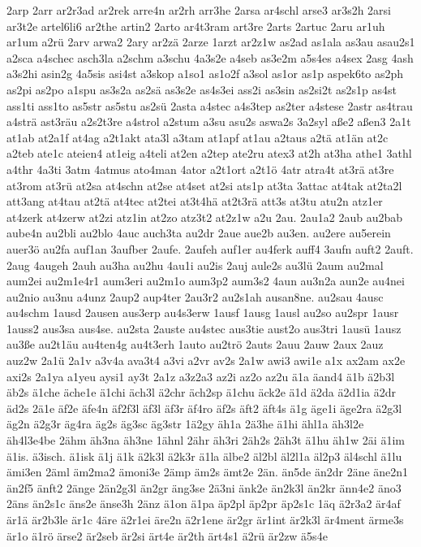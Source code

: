 {2arp
2arr
ar2r3ad
ar2rek
arre4n
ar2rh
arr3he
2arsa
ar4schl
arse3
ar3s2h
2arsi
ar3t2e
artel6li6
ar2the
artin2
2arto
ar4t3ram
art3re
2arts
2artuc
2aru
ar1uh
ar1um
a2rü
2arv
arwa2
2ary
ar2zä
2arze
1arzt
ar2z1w
as2ad
as1ala
as3au
asau2s1
a2sca
a4schec
asch3la
a2schm
a3schu
4a3s2e
a4seb
as3e2m
a5s4es
a4sex
2asg
4ash
a3s2hi
asin2g
4a5sis
asi4st
a3skop
a1so1
as1o2f
a3sol
as1or
as1p
aspek6to
as2ph
as2pi
as2po
a1spu
as3s2a
as2sä
as3s2e
as4s3ei
ass2i
as3sin
as2si2t
as2s1p
as4st
ass1ti
ass1to
as5str
as5stu
as2sü
2asta
a4stec
a4s3tep
as2ter
a4stese
2astr
as4trau
a4strä
ast3räu
a2s2t3re
a4strol
a2stum
a3su
asu2s
aswa2s
3a2syl
aße2
aßen3
2a1t
at1ab
at2a1f
at4ag
a2t1akt
ata3l
a3tam
at1apf
at1au
a2taus
a2tä
at1än
at2c
a2teb
ate1c
ateien4
at1eig
a4teli
at2en
a2tep
ate2ru
atex3
at2h
at3ha
athe1
3athl
a4thr
4a3ti
3atm
4atmus
ato4man
4ator
a2t1ort
a2t1ö
4atr
atra4t
at3rä
at3re
at3rom
at3rü
at2sa
at4schn
at2se
at4set
at2si
ats1p
at3ta
3attac
at4tak
at2ta2l
att3ang
at4tau
at2tä
at4tec
at2tei
at3t4hä
at2t3rä
att3s
at3tu
atu2n
atz1er
at4zerk
at4zerw
at2zi
atz1in
at2zo
atz3t2
at2z1w
a2u
2au.
2au1a2
2aub
au2bab
aube4n
au2bli
au2blo
4auc
auch3ta
au2dr
2aue
aue2b
au3en.
au2ere
au5erein
auer3ö
au2fa
auf1an
3aufber
2aufe.
2aufeh
auf1er
au4ferk
auff4
3aufn
auft2
2auft.
2aug
4augeh
2auh
au3ha
au2hu
4au1i
au2is
2auj
aule2s
au3lü
2aum
au2mal
aum2ei
au2m1e4r1
aum3eri
au2m1o
aum3p2
aum3s2
4aun
au3n2a
aun2e
au4nei
au2nio
au3nu
a4unz
2aup2
aup4ter
2au3r2
au2s1ah
ausan8ne.
au2sau
4ausc
au4schm
1ausd
2ausen
aus3erp
au4s3erw
1ausf
1ausg
1ausl
au2so
au2spr
1ausr
1auss2
aus3sa
aus4se.
au2sta
2auste
au4stec
aus3tie
aust2o
aus3tri
1ausü
1ausz
au3ße
au2t1äu
au4ten4g
au4t3erh
1auto
au2trö
2auts
2auu
2auw
2aux
2auz
auz2w
2a1ü
2a1v
a3v4a
ava3t4
a3vi
a2vr
av2s
2a1w
awi3
awi1e
a1x
ax2am
ax2e
axi2s
2a1ya
a1yeu
aysi1
ay3t
2a1z
a3z2a3
az2i
az2o
az2u
ä1a
äand4
ä1b
ä2b3l
äb2s
ä1che
äche1e
ä1chi
äch3l
ä2chr
äch2sp
ä1chu
äck2e
ä1d
ä2da
ä2d1ia
ä2dr
äd2s
2ä1e
äf2e
äfe4n
äf2f3l
äf3l
äf3r
äf4ro
äf2s
äft2
äft4s
ä1g
äge1i
äge2ra
ä2g3l
äg2n
ä2g3r
äg4ra
äg2s
äg3sc
äg3str
1ä2gy
äh1a
2ä3he
ä1hi
ähl1a
äh3l2e
äh4l3e4be
2ähm
äh3na
äh3ne
1ähnl
2ähr
äh3ri
2äh2s
2äh3t
ä1hu
äh1w
2äi
ä1im
ä1is.
ä3isch.
ä1isk
ä1j
ä1k
ä2k3l
ä2k3r
ä1la
älbe2
äl2bl
äl2l1a
äl2p3
äl4schl
ä1lu
ämi3en
2äml
äm2ma2
ämoni3e
2ämp
äm2s
ämt2e
2än.
än5de
än2dr
2äne
äne2n1
än2f5
änft2
2änge
2än2g3l
än2gr
äng3se
2ä3ni
änk2e
än2k3l
än2kr
änn4e2
äno3
2äns
än2s1c
äns2e
änse3h
2änz
ä1on
ä1pa
äp2pl
äp2pr
äp2s1c
1äq
ä2r3a2
är4af
är1ä
är2b3le
är1c
4äre
ä2r1ei
äre2n
ä2r1ene
är2gr
är1int
är2k3l
är4ment
ärme3s
är1o
ä1rö
ärse2
är2seb
är2si
ärt4e
är2th
ärt4s1
ä2rü
är2zw
ä5s4e
}
